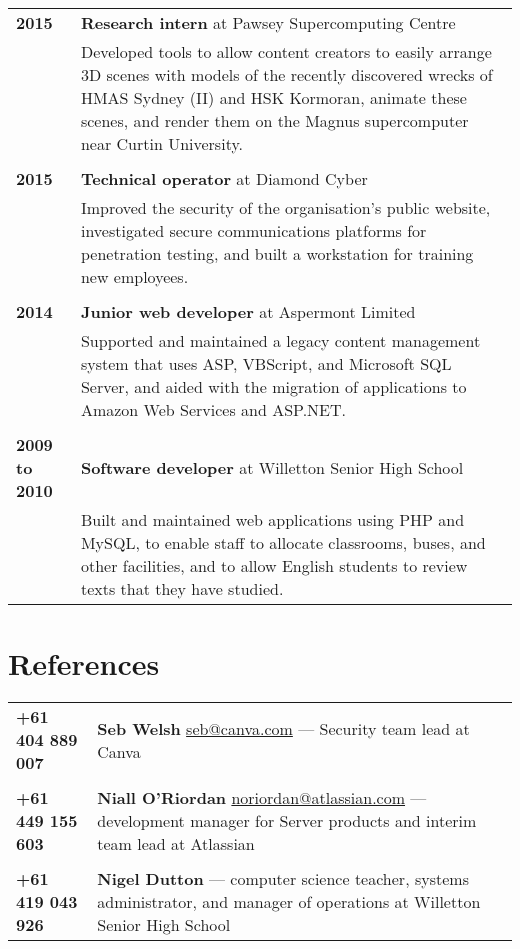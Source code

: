 \documentclass[a4paper,12pt]{article}
\begin{document}
\begin{tabular}{p{35mm}p{125mm}}
	                    \textbf{2015}               & \textbf{Research intern} at Pawsey Supercomputing Centre
	\vspace{0.2em}  \\                              & Developed tools to allow content creators to easily arrange 3D scenes with models of the recently discovered wrecks of HMAS Sydney (II) and HSK Kormoran, animate these scenes, and render them on the Magnus supercomputer near Curtin University.
	\\              \\  \textbf{2015}               & \textbf{Technical operator} at Diamond Cyber
	\vspace{0.2em}  \\                              & Improved the security of the organisation's public website, investigated secure communications platforms for penetration testing, and built a workstation for training new employees.
	\\              \\  \textbf{2014}               & \textbf{Junior web developer} at Aspermont Limited
	\vspace{0.2em}  \\                              & Supported and maintained a legacy content management system that uses ASP, VBScript, and Microsoft SQL Server, and aided with the migration of applications to Amazon Web Services and ASP.NET.
	\\              \\  \textbf{2009 to 2010}       & \textbf{Software developer} at Willetton Senior High School
	\vspace{0.2em}  \\                              & Built and maintained web applications using PHP and MySQL, to enable staff to allocate classrooms, buses, and other facilities, and to allow English students to review texts that they have studied.
\end{tabular}

\section*{References}

\begin{tabular}{p{35mm}p{125mm}}
	                    \textbf{+61 404 889 007}    & \textbf{Seb Welsh} \textlangle{}\href{mailto:seb@canva.com}{seb@canva.com}\textrangle{} --- Security team lead at Canva
	\\              \\  \textbf{+61 449 155 603}    & \textbf{Niall O’Riordan} \textlangle{}\href{mailto:noriordan@atlassian.com}{noriordan@atlassian.com}\textrangle{} --- development manager for Server products and interim team lead at Atlassian
	\\              \\  \textbf{+61 419 043 926}    & \textbf{Nigel Dutton} --- computer science teacher, systems administrator, and manager of operations at Willetton Senior High School
\end{tabular}
\end{document}
